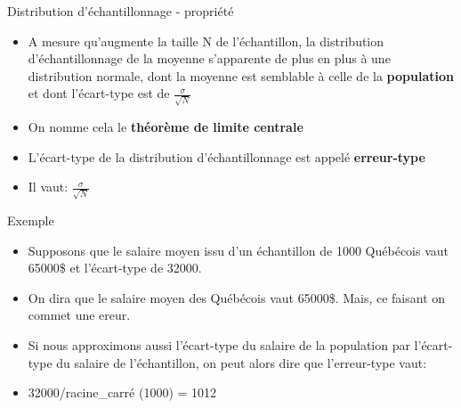 \documentclass[
  ignorenonframetext,
]{beamer}
\providecommand{\tightlist}{%
  \setlength{\itemsep}{0pt}\setlength{\parskip}{0pt}}
\begin{document}
\begin{frame}{Distribution d'échantillonnage - propriété}
\protect\hypertarget{distribution-duxe9chantillonnage---propriuxe9tuxe9}{}
\begin{itemize}
\tightlist
\item
  A mesure qu'augmente la taille N de l'échantillon, la distribution
  d'échantillonnage de la moyenne s'apparente de plus en plus à une
  distribution normale, dont la moyenne est semblable à celle de la
  \textbf{population} et dont l'écart-type est de
  \(\frac{\sigma}{\sqrt{N}}\)
\end{itemize}

\begin{itemize}[<+->]
\tightlist
\item
  On nomme cela le \textbf{théorème de limite centrale}
\end{itemize}

\begin{itemize}[<+->]
\tightlist
\item
  L'écart-type de la distribution d'échantillonnage est appelé
  \textbf{erreur-type}
\end{itemize}

\begin{itemize}[<+->]
\tightlist
\item
  Il vaut: \(\frac{\sigma}{\sqrt{N}}\)
\end{itemize}
\end{frame}

\begin{frame}{Exemple}
\protect\hypertarget{exemple}{}
\begin{itemize}
\tightlist
\item
  Supposons que le salaire moyen issu d'un échantillon de 1000 Québécois
  vaut 65000\$ et l'écart-type de 32000.
\end{itemize}

\begin{itemize}[<+->]
\tightlist
\item
  On dira que le salaire moyen des Québécois vaut 65000\$. Mais, ce
  faisant on commet une ereur.
\end{itemize}

\begin{itemize}[<+->]
\tightlist
\item
  Si nous approximons aussi l'écart-type du salaire de la population par
  l'écart-type du salaire de l'échantillon, on peut alors dire que
  l'erreur-type vaut:
\end{itemize}

\begin{itemize}[<+->]
\tightlist
\item
  32000/racine\_carré (1000) = 1012
\end{itemize}
\end{frame}
\end{document}
